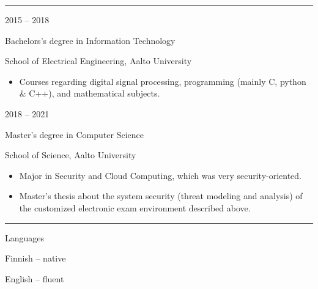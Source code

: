 \documentclass[a4paper,hidelinks,10pt]{article}
\newlength{\cvcolumngapwidth}
\newlength{\cvleftcolumnwidth}
\newlength{\cvrightcolumnwidth}
\newcommand{\cvsectionstyle}[1]{{\normalsize\cvsectionfont\textcolor{cvsectioncolor}{#1}}}
\newcommand{\cvtitlestyle}[1]{{\large\cvtitlefont\textcolor{cvtitlecolor}{#1}}}
\newcommand{\cvdurationstyle}[1]{{\small\cvdurationfont\textcolor{cvdurationcolor}{#1}}}
\newcommand{\cvheadingstyle}[1]{{\normalsize\cvheadingfont\textcolor{cvheadingcolor}{#1}}}
\newlength{\cvafteritemskipamount}
\newlength{\cvaftersectionskipamount}
\newlength{\cvbetweensectionandheadingextraskipamount}
\newlength{\cvaftertitleskipamount}
\newlength{\cvparskip}
\newcommand{\cvsection}[1]{
    \begin{minipage}[t]{\cvleftcolumnwidth}
        \raggedleft\cvsectionstyle{#1}
    \end{minipage}%
    \hspace{\cvcolumngapwidth}%
    \begin{minipage}[t]{\cvrightcolumnwidth}
        \textcolor{cvrulecolor}{\rule{\cvrightcolumnwidth}{0.3mm}}
    \end{minipage}

    \vspace{\cvaftersectionskipamount}
}
\newcommand{\cvitem}[2]{
    \begin{minipage}[t]{\cvleftcolumnwidth}
        \raggedleft #1
    \end{minipage}%
    \hspace{\cvcolumngapwidth}%
    \begin{minipage}[t]{\cvrightcolumnwidth}
        \setlength{\parskip}{\cvparskip} #2
    \end{minipage}

    \vspace{\cvafteritemskipamount}
}
\newcommand{\cvtitle}[1]{
    \cvtitlestyle{#1}

    \vspace{\cvaftertitleskipamount}
    \vspace{-\cvparskip}
}
\begin{document}

\cvsection{EDUCATION}


\cvitem{
    \cvdurationstyle{2015 -- 2018}
}{
    \cvtitle{Bachelors's degree in Information Technology}

    School of Electrical Engineering, Aalto University

    \begin{itemize}[leftmargin=*]
        \item Courses regarding digital signal processing, programming (mainly C, python \& C++), and mathematical subjects.
    \end{itemize}
}

\cvitem{
    \cvdurationstyle{2018 -- 2021}
}{
    \cvtitle{Master's degree in Computer Science}

    School of Science, Aalto University

    \begin{itemize}[leftmargin=*]
        \item Major in Security and Cloud Computing, which was very security-oriented.
        \item Master's thesis about the system security (threat modeling and analysis) of the customized electronic exam environment described above.
    \end{itemize}
}


\newpage

\vspace*{2em}


\cvsection{SKILLS}

\vspace{\cvbetweensectionandheadingextraskipamount}

\cvitem{
    \cvheadingstyle{Languages}
}{
    Finnish -- native

    English -- fluent
}
\end{document}
